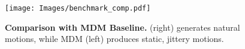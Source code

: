 \begin{figure}
    

    \centering
    
    \texttt{[image: Images/benchmark\_comp.pdf]}
    
    \caption{
        \textbf{Comparison with MDM Baseline.} \algoname (right) generates natural motions, while MDM (left) produces static, jittery motions.
    }
    \label{fig:baseline_comp}
    \Description[]{}  %
\end{figure}

